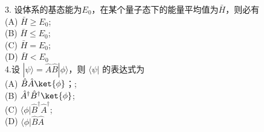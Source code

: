 3. 设体系的基态能为$E_0$，在某个量子态下的能量平均值为$\bar{H} $，则必有\\
   (A) $\bar{H} \geq E_0$; \\
   (B) $\bar{H} \leq E_0$; \\
   (C) $\bar{H} = E_0$; \\
   (D) $\bar{H}< E_0$\\

4.设 $|\psi\rangle = \hat{A}\hat{B}|\phi\rangle$，则 $\langle \psi |$ 的表达式为\\
   (A) $\hat{B} \hat{A}\ket{\phi}$；; \\
   (B) $ \hat{A}^\dagger \hat{B}^\dagger \ket{\phi}$; \\
   (C) $\langle \phi | \hat{B}^{\dagger} \hat{A}^{\dagger}$; \\
   (D)  $\langle \phi | \hat{B} \hat{A}$\\

